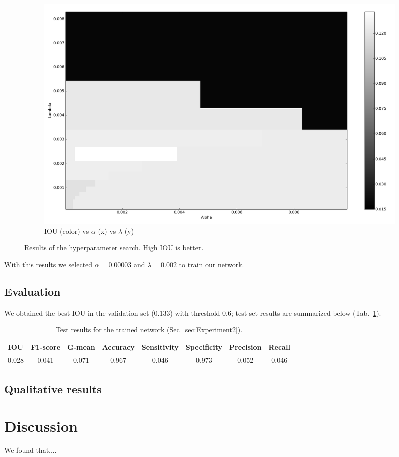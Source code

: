 \begin{figure}[h]
\begin{subfigure}{0.32\textwidth}
		\centering
                \includegraphics[width=\textwidth]{plots/hs4_pcolor.png}
         \caption{IOU (color) vs $\alpha$ (x) vs $\lambda$ (y)}
	\end{subfigure}
	\caption[Hyperparameter search for Experiment 2]{Results of the hyperparameter search. High IOU is better.}
	 \label{fig:Hs4}
\end{figure}

With this results we selected $\alpha = 0.00003$ and $\lambda = 0.002$ to train our network.

\subsection{Evaluation}
We obtained the best IOU in the validation set (0.133) with threshold 0.6; test set results are summarized below (Tab.~\ref{tab:Results2}).
\begin{table}[h]
	\centering
	\begin{tabular}{cccccccc}
	\hline
	\textbf{IOU}	& \textbf{F1-score}	& \textbf{G-mean} &\textbf{Accuracy}	& \textbf{Sensitivity} & \textbf{Specificity} & \textbf{Precision} & \textbf{Recall}\\
	\hline
	 0.028 & 0.041 & 0.071 & 0.967 & 0.046 & 0.973 & 0.052 & 0.046\\
	\hline
	\end{tabular}
	\caption[Results for Experiment 2]{Test results for the trained network (Sec~\ref{sec:Experiment2}).}
	\label{tab:Results2}
\end{table}

\subsection{Qualitative results}


\section{Discussion}
We found that....
